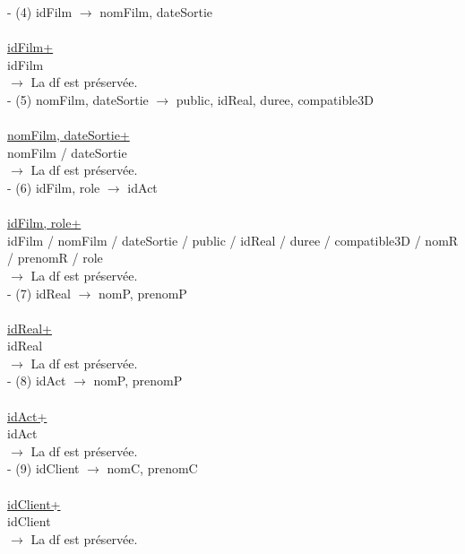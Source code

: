 \documentclass[a4paper,sffamily,12pt]{article}
\begin{document}
					\noindent - (4) idFilm $\rightarrow$ nomFilm, dateSortie \\
						\\
						\underline{idFilm+} \\
						idFilm\\								
					$\rightarrow$ La df est préservée. \\	
					
					\noindent - (5) nomFilm, dateSortie $\rightarrow$ public, idReal, duree, compatible3D \\
						\\
						\underline{nomFilm, dateSortie+} \\
						nomFilm / dateSortie \\									
					$\rightarrow$ La df est préservée. \\	
					
					\noindent - (6) idFilm, role $\rightarrow$  idAct  \\
						\\
						\underline{idFilm, role+} \\
						idFilm / nomFilm / dateSortie / public / idReal / duree / compatible3D / nomR / prenomR / role \\					
					$\rightarrow$ La df est préservée. \\
																				
					\noindent - (7) idReal $\rightarrow$ nomP, prenomP \\
						\\
						\underline{idReal+} \\
						idReal \\								
					$\rightarrow$ La df est préservée. \\	
					
					\noindent - (8) idAct $\rightarrow$ nomP, prenomP \\
						\\
						\underline{idAct+} \\
						idAct \\									
					$\rightarrow$ La df est préservée. \\	
	
					\noindent - (9) idClient $\rightarrow$ nomC, prenomC \\
						\\
						\underline{idClient+} \\
						idClient \\									
					$\rightarrow$ La df est préservée. \\		
	
\end{document}
